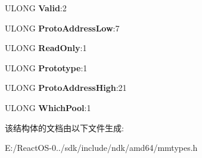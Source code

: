 \begin{DoxyCompactItemize}
U\+L\+O\+NG {\bfseries Valid}\+:2
\item 
\mbox{\label{struct___m_m_p_t_e___p_r_o_t_o_t_y_p_e_a28a8cf13694f8e6d7466d40019ecc882}} 
U\+L\+O\+NG {\bfseries Proto\+Address\+Low}\+:7
\item 
\mbox{\label{struct___m_m_p_t_e___p_r_o_t_o_t_y_p_e_a4d168cbdfd14068234b5effc174b90c2}} 
U\+L\+O\+NG {\bfseries Read\+Only}\+:1
\item 
\mbox{\label{struct___m_m_p_t_e___p_r_o_t_o_t_y_p_e_a637ac956482e374e73a21fa24ccf8e03}} 
U\+L\+O\+NG {\bfseries Prototype}\+:1
\item 
\mbox{\label{struct___m_m_p_t_e___p_r_o_t_o_t_y_p_e_a040b2a6385c4ac6b56d4ec03621043ae}} 
U\+L\+O\+NG {\bfseries Proto\+Address\+High}\+:21
\item 
\mbox{\label{struct___m_m_p_t_e___p_r_o_t_o_t_y_p_e_aa8959a0a599ef1f84e2517c641784b18}} 
U\+L\+O\+NG {\bfseries Which\+Pool}\+:1
\end{DoxyCompactItemize}


该结构体的文档由以下文件生成\+:\begin{DoxyCompactItemize}
\item 
E\+:/\+React\+O\+S-\/0../sdk/include/ndk/amd64/mmtypes.\+h\end{DoxyCompactItemize}
